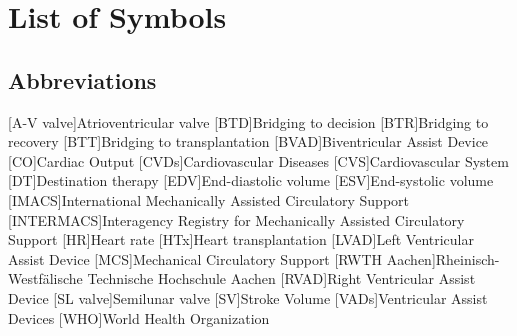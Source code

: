 \chapter*{List of Symbols}										%



\section*{Abbreviations}
%
[A-V valve]{Atrioventricular valve}
[BTD]{Bridging to decision}
[BTR]{Bridging to recovery}
[BTT]{Bridging to transplantation}
[BVAD]{Biventricular Assist Device}
[CO]{Cardiac Output}
[CVDs]{Cardiovascular Diseases}
[CVS]{Cardiovascular System}
[DT]{Destination therapy}
[EDV]{End-diastolic volume}
[ESV]{End-systolic volume}
[IMACS]{International Mechanically Assisted Circulatory Support}
[INTERMACS]{Interagency Registry for Mechanically Assisted Circulatory Support}
[HR]{Heart rate}
[HTx]{Heart transplantation}
[LVAD]{Left Ventricular Assist Device}
[MCS]{Mechanical Circulatory Support}
[RWTH Aachen]{Rheinisch-Westf{\"a}lische Technische Hochschule Aachen}
[RVAD]{Right Ventricular Assist Device}
[SL valve]{Semilunar valve}
[SV]{Stroke Volume}
[VADs]{Ventricular Assist Devices}
[WHO]{World Health Organization}


